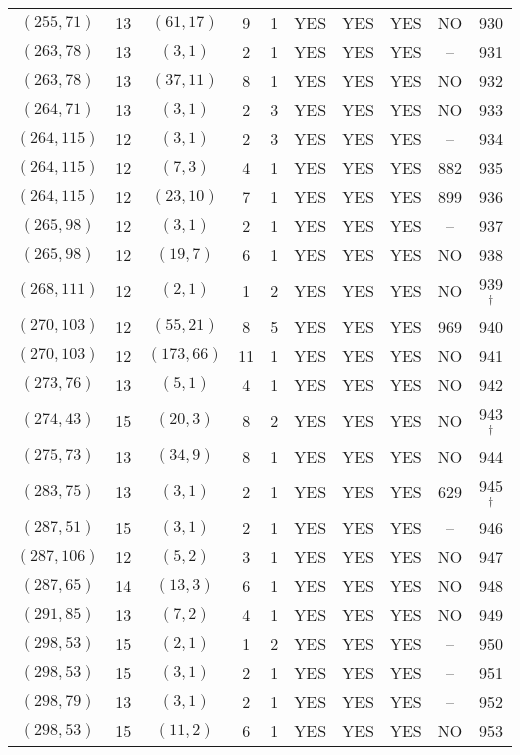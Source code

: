 \begin{longtable}{|c|c|c|c|c|c|c|c|c|c|}
$(255, 71)$ & 13 & $(61, 17)$ & 9 & 1 & YES & YES & YES & NO & 930\\
$(263, 78)$ & 13 & $(3, 1)$ & 2 & 1 & YES & YES & YES & -- & 931\\
$(263, 78)$ & 13 & $(37, 11)$ & 8 & 1 & YES & YES & YES & NO & 932\\
$(264, 71)$ & 13 & $(3, 1)$ & 2 & 3 & YES & YES & YES & NO & 933\\
$(264, 115)$ & 12 & $(3, 1)$ & 2 & 3 & YES & YES & YES & -- & 934\\
$(264, 115)$ & 12 & $(7, 3)$ & 4 & 1 & YES & YES & YES & 882 & 935\\
$(264, 115)$ & 12 & $(23, 10)$ & 7 & 1 & YES & YES & YES & 899 & 936\\
$(265, 98)$ & 12 & $(3, 1)$ & 2 & 1 & YES & YES & YES & -- & 937\\
$(265, 98)$ & 12 & $(19, 7)$ & 6 & 1 & YES & YES & YES & NO & 938\\
$(268, 111)$ & 12 & $(2, 1)$ & 1 & 2 & YES & YES & YES & NO & 939 ${}^\dagger$\\
$(270, 103)$ & 12 & $(55, 21)$ & 8 & 5 & YES & YES & YES & 969 & 940\\
$(270, 103)$ & 12 & $(173, 66)$ & 11 & 1 & YES & YES & YES & NO & 941\\
$(273, 76)$ & 13 & $(5, 1)$ & 4 & 1 & YES & YES & YES & NO & 942\\
$(274, 43)$ & 15 & $(20, 3)$ & 8 & 2 & YES & YES & YES & NO & 943 ${}^\dagger$\\
$(275, 73)$ & 13 & $(34, 9)$ & 8 & 1 & YES & YES & YES & NO & 944\\
$(283, 75)$ & 13 & $(3, 1)$ & 2 & 1 & YES & YES & YES & 629 & 945 ${}^\dagger$\\
$(287, 51)$ & 15 & $(3, 1)$ & 2 & 1 & YES & YES & YES & -- & 946\\
$(287, 106)$ & 12 & $(5, 2)$ & 3 & 1 & YES & YES & YES & NO & 947\\
$(287, 65)$ & 14 & $(13, 3)$ & 6 & 1 & YES & YES & YES & NO & 948\\
$(291, 85)$ & 13 & $(7, 2)$ & 4 & 1 & YES & YES & YES & NO & 949\\
$(298, 53)$ & 15 & $(2, 1)$ & 1 & 2 & YES & YES & YES & -- & 950\\
$(298, 53)$ & 15 & $(3, 1)$ & 2 & 1 & YES & YES & YES & -- & 951\\
$(298, 79)$ & 13 & $(3, 1)$ & 2 & 1 & YES & YES & YES & -- & 952\\
$(298, 53)$ & 15 & $(11, 2)$ & 6 & 1 & YES & YES & YES & NO & 953\\

\end{longtable}
